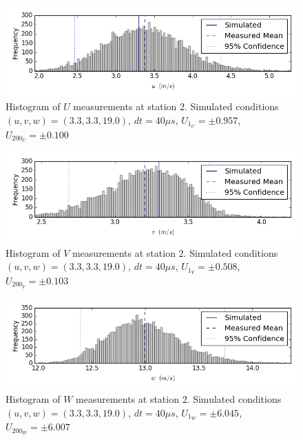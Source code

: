 \begin{figure}[H]
\centering
\includegraphics[width=6in]{figs/Ely_May28th02002/uncertainty_Ely_May28th02002_U}
\caption{Histogram of $U$ measurements at station 2. Simulated conditions $(u,v,w)=(3.3, 3.3, 19.0)$, $dt=40 \mu s$, $U_1_U=\pm 0.957$, $U_200_U=\pm 0.100$}
\label{fig:uncertainty_Ely_May28th02002_U}
\end{figure}


\begin{figure}[H]
\centering
\includegraphics[width=6in]{figs/Ely_May28th02002/uncertainty_Ely_May28th02002_V}
\caption{Histogram of $V$ measurements at station 2. Simulated conditions $(u,v,w)=(3.3, 3.3, 19.0)$, $dt=40 \mu s$, $U_1_V=\pm 0.508$, $U_200_V=\pm 0.103$}
\label{fig:uncertainty_Ely_May28th02002_V}
\end{figure}


\begin{figure}[H]
\centering
\includegraphics[width=6in]{figs/Ely_May28th02002/uncertainty_Ely_May28th02002_W}
\caption{Histogram of $W$ measurements at station 2. Simulated conditions $(u,v,w)=(3.3, 3.3, 19.0)$, $dt=40 \mu s$, $U_1_W=\pm 6.045$, $U_200_W=\pm 6.007$}
\label{fig:uncertainty_Ely_May28th02002_W}
\end{figure}


